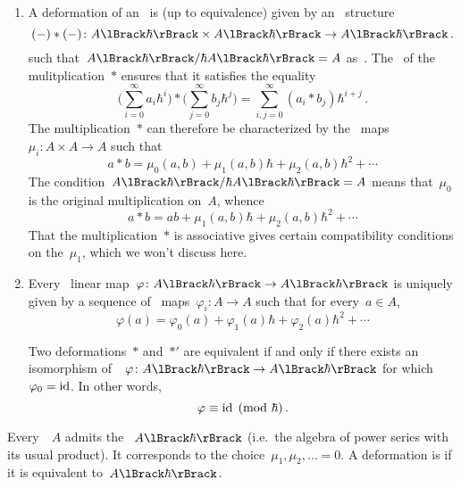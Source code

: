\documentclass[a4paper, 11pt, oneside]{scrartcl}
\begin{document}
\begin{remark}
  \leavevmode
  \begin{enumerate}
    \item
      A deformation of an~\algebra{$\kf$} is (up to equivalence) given by an~\algebra{$\kfhbar$} structure
      \[
        (-) * (-)
        \colon
        \power{A}{\hbar} \times \power{A}{\hbar}
        \to
        \power{A}{\hbar} \,.
      \]
      such that~$\power{A}{\hbar} / \hbar \power{A}{\hbar} = A$ as~\algebras{$\kf$}.
      The~\bilinearity{$\kfhbar$} of the mulitplication~$*$ ensures that it satisfies the equality
      \[
        \Biggl( \sum_{i=0}^\infty a_i \hbar^i \Biggr)
        *
        \Biggl( \sum_{j=0}^\infty b_j \hbar^j \Biggr)
        =
        \sum_{i,j = 0}^\infty (a_i * b_j) \hbar^{i+j} \,.
      \]
      The multiplication~$*$ can therefore be characterized by the~\bilinear{$\kf$} maps~$\mu_i \colon A \times A \to A$ such that
      \[
        a * b
        =
        \mu_0(a, b) + \mu_1(a, b) \hbar + \mu_2(a, b) \hbar^2 + \dotsb
      \]
      The condition~$\power{A}{\hbar} / \hbar \power{A}{\hbar} = A$ means that~$\mu_0$ is the original multiplication on~$A$, whence
      \[
        a * b
        =
        ab + \mu_1(a, b) \hbar + \mu_2(a, b) \hbar^2 + \dotsb
      \]
      That the multiplication~$*$ is associative gives certain compatibility conditions on the~$\mu_1$, which we won’t discuss here.
    \item
      Every~\linear{$\kfhbar$} linear map~$\varphi \colon \power{A}{\hbar} \to \power{A}{\hbar}$ is uniquely given by a sequence of~\linear{$\kf$} maps~$\varphi_i \colon A \to A$ such that for every~$a \in A$,
      \[
        \varphi(a)
        =
        \varphi_0(a) + \varphi_1(a) \hbar + \varphi_2(a) \hbar^2 + \dotsb
      \]

      Two deformations~$*$ and~$*'$ are equivalent if and only if there exists an isomorphism of~\algebras{$\kfhbar$}~$\varphi \colon \power{A}{\hbar} \to \power{A}{\hbar}$ for which~$\varphi_0 = \mathrm{id}$.
      In other words,
      \[
        \varphi \equiv \mathrm{id} \pmod{\hbar} \,.
      \]
  \end{enumerate}
\end{remark}

\begin{example}
  Every~\algebra{$\kf$}~$A$ admits the ~$\power{A}{\hbar}$ (i.e.\ the algebra of power series with its usual product).
  It corresponds to the choice~$\mu_1, \mu_2, \dotsc = 0$.
  A deformation is  if it is equivalent to~$\power{A}{\hbar}$.
\end{example}
\end{document}
